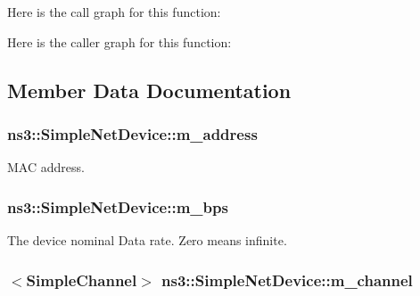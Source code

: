 Here is the call graph for this function\+:




Here is the caller graph for this function\+:




\subsection{Member Data Documentation}
\subsubsection[{\texorpdfstring{m\+\_\+address}{m_address}}]{ ns3\+::\+Simple\+Net\+Device\+::m\+\_\+address\hspace{0.3cm}{\ttfamily [private]}}\hypertarget{classns3_1_1SimpleNetDevice_ac3dda22026d7c5fbbba243db41e0e2dd}{}\label{classns3_1_1SimpleNetDevice_ac3dda22026d7c5fbbba243db41e0e2dd}


M\+AC address. 

\subsubsection[{\texorpdfstring{m\+\_\+bps}{m_bps}}]{ ns3\+::\+Simple\+Net\+Device\+::m\+\_\+bps\hspace{0.3cm}{\ttfamily [private]}}\hypertarget{classns3_1_1SimpleNetDevice_a6655e469fb351d5c541abf96c2928daa}{}\label{classns3_1_1SimpleNetDevice_a6655e469fb351d5c541abf96c2928daa}


The device nominal Data rate. Zero means infinite. 

\subsubsection[{\texorpdfstring{m\+\_\+channel}{m_channel}}]{$<${\bf Simple\+Channel}$>$ ns3\+::\+Simple\+Net\+Device\+::m\+\_\+channel\hspace{0.3cm}{\ttfamily [private]}}\hypertarget{classns3_1_1SimpleNetDevice_aac80c92fff8c2a189c1186d8d41a4808}{}\label{classns3_1_1SimpleNetDevice_aac80c92fff8c2a189c1186d8d41a4808}


